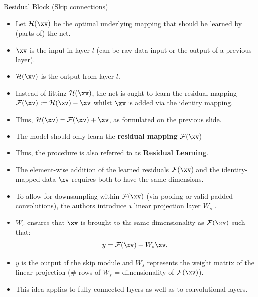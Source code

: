 \begin{vbframe}{Residual Block (Skip connections)}
\framebreak
    \begin{itemize}
        \item Let $\mathcal{H}(\xv)$ be the optimal underlying mapping that should be learned by (parts of) the net.
        \item $\xv$ is the input in layer $l$ (can be raw data input or the output of a previous layer).
        \item $\mathcal{H}(\xv)$ is the output from layer $l$.
        \item Instead of fitting $\mathcal{H}(\xv)$, the net is ought to learn the residual mapping $\mathcal{F}(\xv):=\mathcal{H}(\xv)-\xv$ whilst $\xv$ is added via the identity mapping.
        \item Thus, $\mathcal{H}(\xv) = \mathcal{F}(\xv) + \xv$, as formulated on the previous slide.
        \item The model should only learn the \textbf{residual mapping} $\mathcal{F}(\xv)$ 
        \item Thus, the procedure is also referred to as \textbf{Residual Learning}.
    \end{itemize}
\framebreak
    \begin{itemize}
        \item The element-wise addition of the learned residuals $\mathcal{F}(\xv)$ and the identity-mapped data $\xv$ requires both to have the same dimensions.
        \item To allow for downsampling within $\mathcal{F}(\xv)$ (via pooling or valid-padded convolutions), the authors introduce a linear projection layer $W_s$ .
        \item $W_s$ ensures that $\xv$ is brought to the same dimensionality as $\mathcal{F}(\xv)$ such that:
        $$
            y = \mathcal{F}(\xv) + W_s\xv,
        $$
        \item $y$ is the output of the skip module and $W_s$ represents the weight matrix of the linear projection (\# rows of $W_s$ = dimensionality of $\mathcal{F}(\xv)$).
        \item This idea applies to fully connected layers as well as to convolutional layers.
    \end{itemize}
\end{vbframe}

  \framebreak


